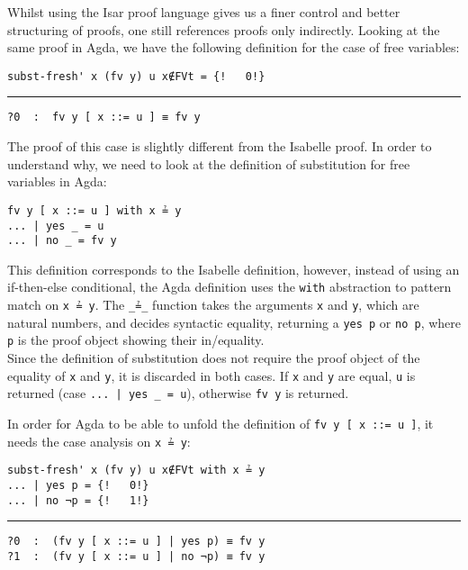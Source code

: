 \documentclass[a4paper, 12pt, twoside]{style/ociamthesis}
\theoremstyle{plain}
\theoremstyle{definition}
\theoremstyle{remark}
\begin{document}
Whilst using the Isar proof language gives us a finer control and better
structuring of proofs, one still references proofs only indirectly.
Looking at the same proof in Agda, we have the following definition for
the case of free variables:

\begin{verbatim}
subst-fresh' x (fv y) u x∉FVt = {!   0!}
\end{verbatim}

\noindent\rule{8cm}{0.4pt}

\begin{verbatim}
?0  :  fv y [ x ::= u ] ≡ fv y
\end{verbatim}

The proof of this case is slightly different from the Isabelle proof. In
order to understand why, we need to look at the definition of
substitution for free variables in Agda:

\begin{verbatim}
fv y [ x ::= u ] with x ≟ y
... | yes _ = u
... | no _ = fv y
\end{verbatim}

This definition corresponds to the Isabelle definition, however, instead
of using an if-then-else conditional, the Agda definition uses the
\texttt{with} abstraction to pattern match on \texttt{x ≟ y}. The
\texttt{\_≟\_} function takes the arguments \texttt{x} and \texttt{y},
which are natural numbers, and decides syntactic equality, returning a
\texttt{yes p} or \texttt{no p}, where \texttt{p} is the proof object
showing their in/equality.\\
Since the definition of substitution does not require the proof object
of the equality of \texttt{x} and \texttt{y}, it is discarded in both
cases. If \texttt{x} and \texttt{y} are equal, \texttt{u} is returned
(case \texttt{... | yes \_ = u}), otherwise \texttt{fv y} is returned.

In order for Agda to be able to unfold the definition of
\texttt{fv y [ x ::= u ]}, it needs the case analysis on \texttt{x ≟ y}:

\begin{verbatim}
subst-fresh' x (fv y) u x∉FVt with x ≟ y
... | yes p = {!   0!}
... | no ¬p = {!   1!}
\end{verbatim}

\noindent\rule{8cm}{0.4pt}

\begin{verbatim}
?0  :  (fv y [ x ::= u ] | yes p) ≡ fv y
?1  :  (fv y [ x ::= u ] | no ¬p) ≡ fv y
\end{verbatim}
\end{document}

